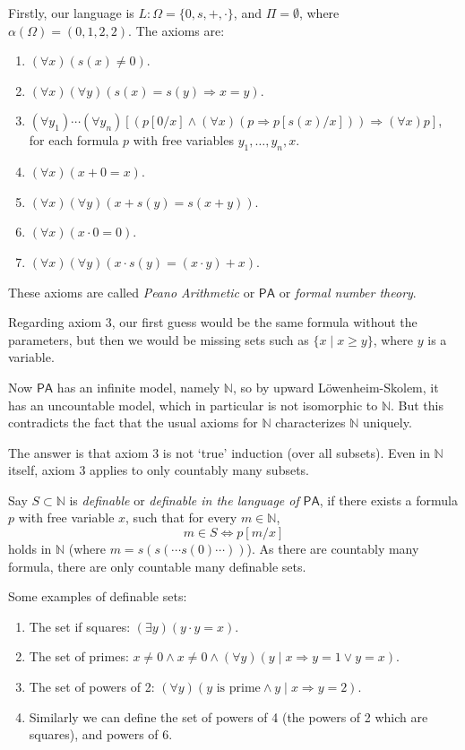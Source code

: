 \documentclass[12pt]{article}
\begin{document}
Firstly, our language is $L : \Omega = \{0, s, +, \cdot\}$, and $\Pi = \emptyset$, where $\alpha(\Omega) = (0, 1, 2, 2)$. The axioms are:
\begin{enumerate}
	\item $(\forall x)(s(x) \neq 0)$.
	\item $(\forall x)(\forall y)(s(x) = s(y) \Rightarrow x = y)$.
	\item $(\forall y_1) \cdots (\forall y_n)[(p[0/x] \wedge (\forall x)(p \Rightarrow p[s(x)/x])) \Rightarrow (\forall x)p]$, for each formula $p$ with free variables $y_1, \ldots, y_n, x$.
	\item $(\forall x)(x + 0 = x)$.
	\item $(\forall x)(\forall y)(x + s(y) = s(x+y))$.
	\item $(\forall x)(x \cdot 0 = 0)$.
	\item $(\forall x)(\forall y)(x \cdot s(y) = (x \cdot y) + x)$.
\end{enumerate}

These axioms are called \emph{Peano Arithmetic} or $\mathsf{PA}$ or \emph{formal number theory}.

Regarding axiom 3, our first guess would be the same formula without the parameters, but then we would be missing sets such as $\{x \mid x \geq y\}$, where $y$ is a variable.

Now $\mathsf{PA}$ has an infinite model, namely $\mathbb{N}$, so by upward L\"{o}wenheim-Skolem, it has an uncountable model, which in particular is not isomorphic to $\mathbb{N}$. But this contradicts the fact that the usual axioms for $\mathbb{N}$ characterizes $\mathbb{N}$ uniquely.

The answer is that axiom 3 is not `true' induction (over all subsets). Even in $\mathbb{N}$ itself, axiom 3 applies to only countably many subsets.

Say $S \subset \mathbb{N}$ is \emph{definable} or \emph{definable in the language of} $\mathsf{PA}$, if there exists a formula $p$ with free variable $x$, such that for every $m \in \mathbb{N}$,
\[
	m \in S \iff p[m/x]
\]
holds in $\mathbb{N}$ (where $m = s(s(\cdots s(0) \cdots))$). As there are countably many formula, there are only countable many definable sets.

\begin{exbox}
	Some examples of definable sets:
	\begin{enumerate}
		\item The set if squares: $(\exists y)(y \cdot y = x)$.
		\item The set of primes: $x \neq 0 \wedge x \neq 0 \wedge (\forall y)(y \mid x \Rightarrow y = 1 \vee y = x)$.
		\item The set of powers of 2: $(\forall y)(y \text{ is prime} \wedge y \mid x \Rightarrow y = 2)$.
		\item Similarly we can define the set of powers of 4 (the powers of 2 which are squares), and powers of 6.
	\end{enumerate}
\end{exbox}
\end{document}
